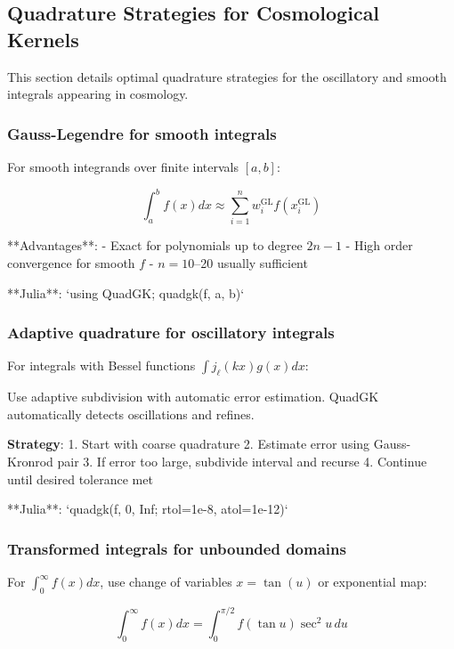 \subsection{Quadrature Strategies for Cosmological Kernels}\label{subsec:num_quadrature}

This section details optimal quadrature strategies for the oscillatory and smooth integrals appearing in cosmology.

\subsubsection{Gauss-Legendre for smooth integrals}

For smooth integrands over finite intervals $[a,b]$:

\begin{equation}
\int_a^b f(x) dx \approx \sum_{i=1}^n w_i^{\text{GL}} f(x_i^{\text{GL}})
\end{equation}

**Advantages**:
- Exact for polynomials up to degree $2n-1$
- High order convergence for smooth $f$
- $n = 10$--20 usually sufficient

**Julia**: `using QuadGK; quadgk(f, a, b)`

\subsubsection{Adaptive quadrature for oscillatory integrals}

For integrals with Bessel functions $\int j_\ell(kx) g(x) dx$:

Use adaptive subdivision with automatic error estimation. QuadGK automatically detects oscillations and refines.

\textbf{Strategy}:
1. Start with coarse quadrature
2. Estimate error using Gauss-Kronrod pair
3. If error too large, subdivide interval and recurse
4. Continue until desired tolerance met

**Julia**: `quadgk(f, 0, Inf; rtol=1e-8, atol=1e-12)`

\subsubsection{Transformed integrals for unbounded domains}

For $\int_0^\infty f(x) dx$, use change of variables $x = \tan(u)$ or exponential map:

\begin{equation}
\int_0^\infty f(x) dx = \int_0^{\pi/2} f(\tan u) \sec^2 u \, du
\end{equation}

